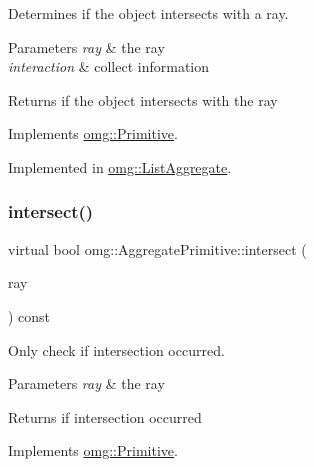 Determines if the object intersects with a ray. 


\begin{DoxyParams}{Parameters}
{\em ray} & the ray \\
\hline
{\em interaction} & collect information \\
\hline
\end{DoxyParams}
\begin{DoxyReturn}{Returns}
if the object intersects with the ray 
\end{DoxyReturn}


Implements \mbox{\hyperlink{classomg_1_1_primitive_a51f78d3f52794ae02e18688dff75414c}{omg\+::\+Primitive}}.



Implemented in \mbox{\hyperlink{classomg_1_1_list_aggregate_a55fdd3b0fa387cb14488b86634b3e877}{omg\+::\+List\+Aggregate}}.

\mbox{\label{classomg_1_1_aggregate_primitive_af6009e1c54b0f2341d78d95afb4268cc}} 
\subsubsection{\texorpdfstring{intersect()}{intersect()}\hspace{0.1cm}{\footnotesize\ttfamily [2/2]}}
{\footnotesize\ttfamily virtual bool omg\+::\+Aggregate\+Primitive\+::intersect (\begin{DoxyParamCaption}\item[{const \mbox{\hyperlink{classomg_1_1_ray}{Ray}} \&}]{ray }\end{DoxyParamCaption}) const\hspace{0.3cm}{\ttfamily [pure virtual]}}



Only check if intersection occurred. 


\begin{DoxyParams}{Parameters}
{\em ray} & the ray \\
\hline
\end{DoxyParams}
\begin{DoxyReturn}{Returns}
if intersection occurred 
\end{DoxyReturn}


Implements \mbox{\hyperlink{classomg_1_1_primitive_a139c012a57ad2322c5bef078b5d7e653}{omg\+::\+Primitive}}.



